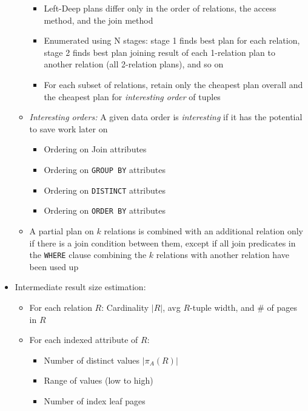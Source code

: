 \documentclass[landscape,8pt]{extarticle}
\newcommand{\code}{\lstinline}
\begin{document}
\begin{multicols}{5}
\begin{itemize}
\begin{itemize}
\begin{itemize}
                            \item Left-Deep plans differ only in the order of relations, the access method, and the join method
                            \item Enumerated using N stages: stage 1 finds best plan for each relation, stage 2 finds best plan joining result of each 1-relation plan to another relation (all 2-relation plans), and so on
                            \item For each subset of relations, retain only the cheapest plan overall and the cheapest plan for \emph{interesting order} of tuples
                        \end{itemize}
                  \item \emph{Interesting orders:} A given data order is \emph{interesting} if it has the potential to save work later on
                        \begin{itemize}
                            \item Ordering on Join attributes
                            \item Ordering on \code{GROUP BY} attributes
                            \item Ordering on \code{DISTINCT} attributes
                            \item Ordering on \code{ORDER BY} attributes
                        \end{itemize}
                  \item A partial plan on $k$ relations is combined with an additional relation only if there is a join condition between them, except if all join predicates in the \code{WHERE} clause combining the $k$ relations with another relation have been used up
              \end{itemize}
        \item Intermediate result size estimation:
              \begin{itemize}
                  \item For each relation $R$: Cardinality $|R|$, avg $R$-tuple width, and \# of pages in $R$
                  \item For each indexed attribute of $R$:
                        \begin{itemize}
                            \item Number of distinct values $|\pi_A(R)|$
                            \item Range of values (low to high)
                            \item Number of index leaf pages

\end{itemize}
\end{itemize}
\end{itemize}
\end{multicols}
\end{document}
